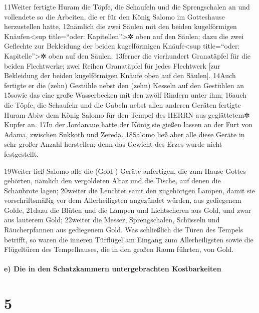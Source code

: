 11Weiter fertigte Huram die Töpfe, die Schaufeln und die Sprengschalen
an und vollendete so die Arbeiten, die er für den König Salomo im
Gotteshause herzustellen hatte, 12nämlich die zwei Säulen mit den beiden
kugelförmigen Knäufen\textless sup title=``oder:
Kapitellen''\textgreater✲ oben auf den Säulen; dazu die zwei Geflechte
zur Bekleidung der beiden kugelförmigen Knäufe\textless sup
title=``oder: Kapitelle''\textgreater✲ oben auf den Säulen; 13ferner die
vierhundert Granatäpfel für die beiden Flechtwerke; zwei Reihen
Granatäpfel für jedes Flechtwerk {[}zur Bekleidung der beiden
kugelförmigen Knäufe oben auf den Säulen{]}. 14Auch fertigte er die
(zehn) Gestühle nebst den (zehn) Kesseln auf den Gestühlen an 15sowie
das eine große Wasserbecken mit den zwölf Rindern unter ihm; 16auch die
Töpfe, die Schaufeln und die Gabeln nebst allen anderen Geräten fertigte
Huram-Abiw dem König Salomo für den Tempel des HERRN aus geglättetem✲
Kupfer an. 17In der Jordanaue hatte der König sie gießen lassen an der
Furt von Adama, zwischen Sukkoth und Zereda. 18Salomo ließ aber alle
diese Geräte in sehr großer Anzahl herstellen; denn das Gewicht des
Erzes wurde nicht festgestellt.

19Weiter ließ Salomo alle die (Gold-) Geräte anfertigen, die zum Hause
Gottes gehörten, nämlich den vergoldeten Altar und die Tische, auf denen
die Schaubrote lagen; 20weiter die Leuchter samt den zugehörigen Lampen,
damit sie vorschriftsmäßig vor dem Allerheiligsten angezündet würden,
aus gediegenem Golde, 21dazu die Blüten und die Lampen und Lichtscheren
aus Gold, und zwar aus lauterem Gold; 22weiter die Messer,
Sprengschalen, Schüsseln und Räucherpfannen aus gediegenem Gold. Was
schließlich die Türen des Tempels betrifft, so waren die inneren
Türflügel am Eingang zum Allerheiligsten sowie die Flügeltüren des
Tempelhauses, die in den großen Raum führten, von Gold.

\hypertarget{e-die-in-den-schatzkammern-untergebrachten-kostbarkeiten}{%
\paragraph{e) Die in den Schatzkammern untergebrachten
Kostbarkeiten}\label{e-die-in-den-schatzkammern-untergebrachten-kostbarkeiten}}

\hypertarget{section-4}{%
\section{5}\label{section-4}}

